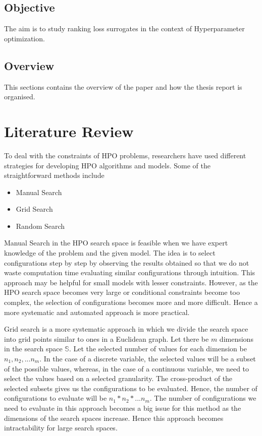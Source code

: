 \documentclass[11pt]{report}
\begin{document}
\section{Objective}
The aim is to study ranking loss surrogates in the context of Hyperparameter optimization.

\section{Overview}
This sections contains the overview of the paper and how the thesis report is organised.


\chapter{Literature Review}
To deal with the constraints of HPO problems, researchers have used different strategies for developing HPO algorithms and models.
Some of the straightforward methods include
\begin{itemize}
\item Manual Search
\item Grid Search
\item Random Search
\end{itemize}


Manual Search in the HPO search space is feasible when we have expert knowledge of the problem and the given model. 
The idea is to select configurations step by step by observing the results obtained
so that we do not waste computation time evaluating similar configurations through intuition.
This approach may be helpful for small models with lesser constraints.
However, as the HPO search space becomes very large or conditional constraints become too complex, the selection of configurations becomes more and more difficult.
Hence a more systematic and automated approach is more practical.

Grid search is a more systematic approach in which we divide the search space into grid points similar to ones in a Euclidean graph.
Let there be $m$ dimensions in the search space $\mathbb{S}$. Let the selected number of values for each dimension be $n_1, n_2, ... n_m$. In the case of a discrete variable, the selected values will be a subset of the possible values, whereas, in the case of a continuous variable, we need to select the values based on a selected granularity.
The cross-product of the selected subsets gives us the configurations to be evaluated. Hence, the number of configurations to evaluate will be $n_1 * n_2 * ... n_m$.
The number of configurations we need to evaluate in this approach becomes a big issue for this method as the dimensions of the search spaces increase.
Hence this approach becomes intractability for large search spaces.
\end{document}
